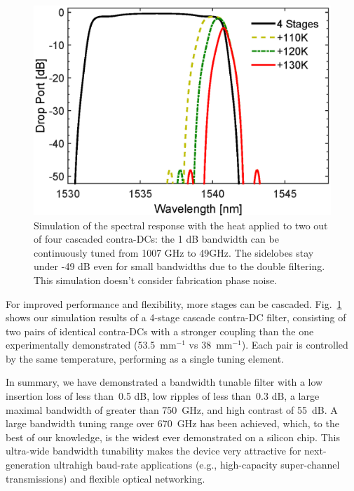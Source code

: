 \documentclass[9pt,twocolumn,twoside]{osajnl}
\begin{document}
	
	\begin{figure}[htbp]
		\centering
		\includegraphics[width=.99\columnwidth]{data/4StageDesignCompiled2}
		\caption{Simulation of the spectral response with the heat applied to two out of four cascaded contra-DCs: the 1 dB bandwidth can be continuously tuned from 1007 GHz to  49GHz. The sidelobes stay under -49 dB even for small bandwidths due to the double filtering. This simulation doesn't consider fabrication phase noise.}
		\label{fig:bandTuneSimu}
	\end{figure} 
	
	For improved performance and flexibility, more stages can be cascaded.
	Fig.~\ref{fig:bandTuneSimu} shows our simulation results of a 4-stage cascade contra-DC filter, consisting of two pairs of identical contra-DCs with a stronger coupling than the one experimentally demonstrated (53.5~mm$^{-1}$ vs 38~mm$^{-1}$). Each pair is controlled by the same temperature, performing as a single tuning element.
	
	
	
	In summary, we have demonstrated a bandwidth tunable filter with a low insertion loss of less than~0.5 dB, low ripples of less than~0.3 dB, a large maximal bandwidth of greater than 750~GHz, and high contrast of 55~dB. 
	A large bandwidth tuning range over 670~GHz has been achieved, which, to the best of our knowledge, is the widest ever demonstrated on a silicon chip. 
	This ultra-wide bandwidth tunability makes the device very attractive for next-generation ultrahigh baud-rate applications (e.g., high-capacity super-channel transmissions) and flexible optical networking. 
	
\end{document}
